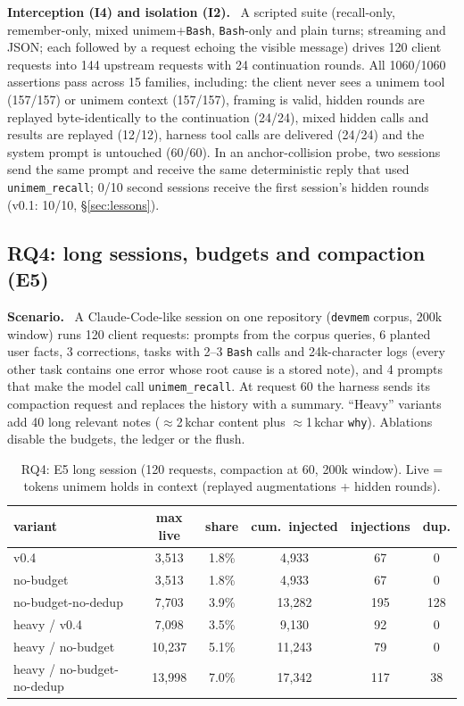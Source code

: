 \documentclass[10pt,twocolumn]{article}
\newcommand{\sys}{\textsf{unimem}}
\newcommand{\code}[1]{\texttt{\small #1}}
\newcommand{\para}[1]{\smallskip\noindent\textbf{#1}\ }
\begin{document}
\para{Interception (I4) and isolation (I2).} A scripted suite (recall-only, remember-only, mixed \sys{}+\code{Bash},
\code{Bash}-only and plain turns; streaming and JSON; each followed by a request echoing the visible message) drives
120 client requests into 144 upstream requests with 24 continuation rounds. All 1060/1060 assertions pass across 15
families, including: the client never sees a \sys{} tool (157/157) or \sys{} context (157/157), framing is valid,
hidden rounds are replayed byte-identically to the continuation (24/24), mixed hidden calls and results are replayed
(12/12), harness tool calls are delivered (24/24) and the system prompt is untouched (60/60). In an anchor-collision probe,
two sessions send the same prompt and receive the same deterministic reply that used \code{unimem\_recall}; 0/10 second
sessions receive the first session's hidden rounds (v0.1: 10/10, \S\ref{sec:lessons}).

\subsection{RQ4: long sessions, budgets and compaction (E5)}
\label{sec:rq4}

\para{Scenario.} A Claude-Code-like session on one repository (\code{devmem} corpus, 200k window) runs 120 client
requests: prompts from the corpus queries, 6 planted user facts, 3 corrections, tasks with 2--3 \code{Bash} calls and
24k-character logs (every other task contains one error whose root cause is a stored note), and 4 prompts that make the
model call \code{unimem\_recall}. At request 60 the harness sends its compaction request and replaces the history with
a summary. ``Heavy'' variants add 40 long relevant notes ($\approx$2\,kchar content plus $\approx$1\,kchar \code{why}).
Ablations disable the budgets, the ledger or the flush.

\begin{table}[t]
\centering\scriptsize
\caption{RQ4: E5 long session (120 requests, compaction at 60, 200k window). Live = tokens \sys{} holds in context
(replayed augmentations + hidden rounds).}
\label{tab:e5}
\setlength{\tabcolsep}{2.4pt}
\begin{tabular}{@{}lccccc@{}}
\toprule
variant & max live & share & cum.\ injected & injections & dup. \\
\midrule
\rowcolor{ours} v0.4 & 3,513 & 1.8\% & 4,933 & 67 & 0 \\
no-budget & 3,513 & 1.8\% & 4,933 & 67 & 0 \\
no-budget-no-dedup & 7,703 & 3.9\% & 13,282 & 195 & 128 \\
\rowcolor{ours} heavy / v0.4 & 7,098 & 3.5\% & 9,130 & 92 & 0 \\
heavy / no-budget & 10,237 & 5.1\% & 11,243 & 79 & 0 \\
heavy / no-budget-no-dedup & 13,998 & 7.0\% & 17,342 & 117 & 38 \\
\bottomrule
\end{tabular}
\end{table}
\end{document}
